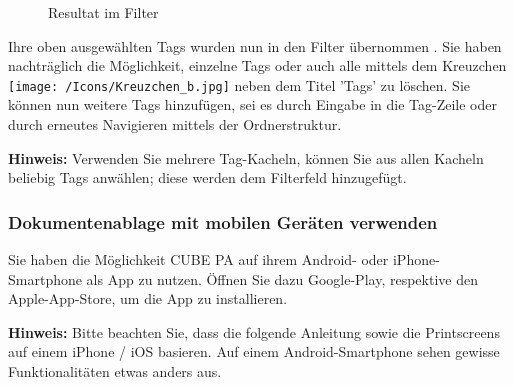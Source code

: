 \begin{figure}[H]
\caption{Resultat im Filter}
\end{figure}

Ihre oben ausgewählten Tags wurden nun in den Filter übernommen . Sie haben nachträglich die Möglichkeit, einzelne Tags oder auch alle mittels dem Kreuzchen \texttt{[image: /Icons/Kreuzchen\_b.jpg]} neben dem Titel 'Tags' zu löschen. Sie können nun weitere Tags hinzufügen, sei es durch Eingabe in die Tag-Zeile oder durch erneutes Navigieren mittels der Ordnerstruktur.

\vspace{\baselineskip}

\textbf{Hinweis:} Verwenden Sie mehrere Tag-Kacheln, können Sie aus allen Kacheln beliebig Tags anwählen; diese werden dem Filterfeld hinzugefügt.

\subsubsection{Dokumentenablage mit mobilen Geräten verwenden}

Sie haben die Möglichkeit CUBE PA auf ihrem Android- oder iPhone-Smartphone als App zu nutzen. Öffnen Sie dazu Google-Play, respektive den Apple-App-Store, um die App zu installieren.

\vspace{\baselineskip}

\textbf{Hinweis:} Bitte beachten Sie, dass die folgende Anleitung sowie die Printscreens auf einem iPhone / iOS basieren. Auf einem Android-Smartphone sehen gewisse Funktionalitäten etwas anders aus.

\vspace{\baselineskip}

